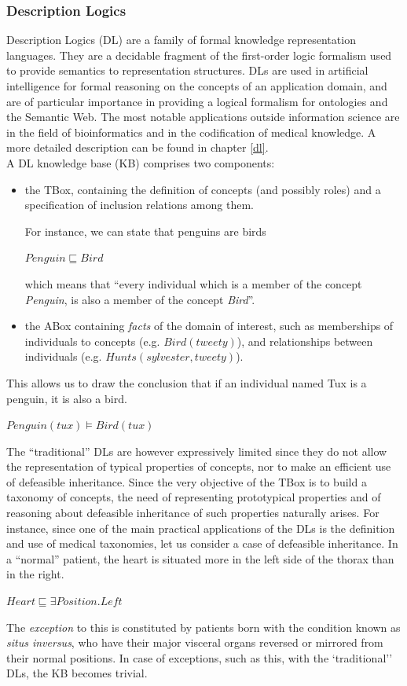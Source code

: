 \documentclass[a4paper, 11pt, oneside]{duthesis}
\begin{document}
\subsubsection{Description Logics}
Description Logics (DL) are a family of formal knowledge representation languages. They are a decidable fragment of the first-order logic formalism used to provide semantics to representation structures.
DLs are used in artificial intelligence for formal reasoning on the concepts of an application domain, and are of particular importance in providing a logical formalism for ontologies and the Semantic Web. The most notable applications outside information science are in the field of bioinformatics and in the codification of medical knowledge. A more detailed description can be found in chapter \ref{dl}.\\


A DL knowledge base (KB) comprises two components:
\begin{itemize}
	\item the TBox, containing the definition of concepts (and possibly roles) and a specification of inclusion relations among them.
	
	For instance, we can state that penguins are birds
\begin{center}$Penguin\sqsubseteq Bird$\end{center}
which means that ``every individual which is a member of the concept \emph{Penguin}, is also a member of the concept \emph{Bird}''.
	\item the ABox containing \emph{facts} of the domain of interest, such as memberships of individuals to concepts (e.g. $Bird(tweety)$), and relationships between individuals (e.g. $Hunts(sylvester, tweety)$).
\end{itemize}


This allows us to draw the conclusion that if an individual named Tux is a penguin, it is also a bird.
\begin{center}$Penguin(tux)\models Bird(tux)$\end{center}

The ``traditional'' DLs are however expressively limited since they do not allow the representation of typical properties of concepts, nor to make an efficient use of defeasible inheritance.
Since the very objective of the TBox is to build a taxonomy of concepts, the need of representing prototypical properties and of reasoning about defeasible inheritance of such properties naturally arises.
For instance, since one of the main practical applications of the DLs is the definition and use of medical taxonomies, let us consider a case of defeasible inheritance.
In a ``normal'' patient, the heart is situated more in the left side of the thorax than in the right.
\begin{center}
$Heart \sqsubseteq \exists Position.Left$
\end{center}
The \emph{exception} to this is constituted by patients born with the condition known as \emph{situs inversus}, who have their major visceral organs reversed or mirrored from their normal positions. In case of exceptions, such as this, with the `traditional'' DLs, the KB becomes trivial.\\
\end{document}
